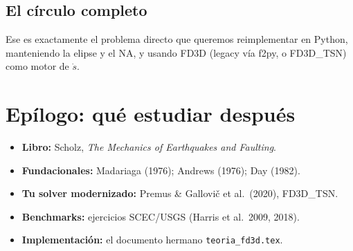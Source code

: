 \documentclass[11pt,a4paper]{article}
\newcommand{\taup}{\tau_p}
\begin{document}
\subsection{El círculo completo}
\begin{center}
\end{center}
Ese es exactamente el problema directo que queremos reimplementar en Python,
manteniendo la elipse y el NA, y usando FD3D (legacy vía f2py, o FD3D\_TSN) como
motor de $\dot s$.

\section*{Epílogo: qué estudiar después}
\begin{itemize}
  \item \textbf{Libro:} Scholz, \emph{The Mechanics of Earthquakes and Faulting}.
  \item \textbf{Fundacionales:} Madariaga (1976); Andrews (1976); Day (1982).
  \item \textbf{Tu solver modernizado:} Premus \& Gallovič et al.\ (2020), FD3D\_TSN.
  \item \textbf{Benchmarks:} ejercicios SCEC/USGS (Harris et al.\ 2009, 2018).
  \item \textbf{Implementación:} el documento hermano \texttt{teoria\_fd3d.tex}.
\end{itemize}
\end{document}
